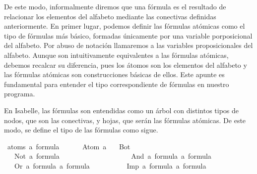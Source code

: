 \begin{isabellebody}
\begin{isamarkuptext}
De este modo, informalmente diremos que una fórmula es el resultado de relacionar los elementos del 
alfabeto mediante las conectivas definidas anteriormente. En primer lugar, podemos definir las 
fórmulas atómicas como el tipo de fórmulas más básico, formadas únicamente por una variable 
porposicional del alfabeto. Por abuso de notación llamaremos  a las variables proposicionales
del alfabeto. Aunque son intuitivamente equivalentes a las fórmulas atómicas, debemos recalcar 
su diferencia, pues los átomos son los elementos del alfabeto y las fórmulas atómicas son
construcciones básicas de ellos. Este apunte es fundamental para entender el tipo correspondiente
de fórmulas en nuestro programa.%
\end{isamarkuptext}\isamarkuptrue%
%
\begin{isamarkuptext}%
En Isabelle, las fórmulas son entendidas como un árbol con distintos tipos de nodos, que
son las conectivas, y hojas, que serán las fórmulas atómicas. De este modo, se define el tipo de 
las fórmulas como sigue.%
\end{isamarkuptext}\isamarkuptrue%
\isamarkupfalse%
\ {\isacharparenleft}atoms{\isacharcolon}\ {\isacharprime}a{\isacharparenright}\ formula\ {\isacharequal}\ \isanewline
\ \ \ \ Atom\ {\isacharprime}a\isanewline
\ \ {\isacharbar}\ Bot\ \ \ \ \ \ \ \ \ \ \ \ \ \ \ \ \ \ \ \ \ \ \ \ \ \ \ \ \ \ {\isacharparenleft}{\isachardoublequoteopen}{\isasymbottom}{\isachardoublequoteclose}{\isacharparenright}\ \ \isanewline
\ \ {\isacharbar}\ Not\ {\isachardoublequoteopen}{\isacharprime}a\ formula{\isachardoublequoteclose}\ \ \ \ \ \ \ \ \ \ \ \ \ \ \ \ \ {\isacharparenleft}{\isachardoublequoteopen}\isactrlbold {\isasymnot}{\isachardoublequoteclose}{\isacharparenright}\isanewline
\ \ {\isacharbar}\ And\ {\isachardoublequoteopen}{\isacharprime}a\ formula{\isachardoublequoteclose}\ {\isachardoublequoteopen}{\isacharprime}a\ formula{\isachardoublequoteclose}\ \ \ \ {\isacharparenleft}\ {\isachardoublequoteopen}\isactrlbold {\isasymand}{\isachardoublequoteclose}\ {}{}{\isacharparenright}\isanewline
\ \ {\isacharbar}\ Or\ {\isachardoublequoteopen}{\isacharprime}a\ formula{\isachardoublequoteclose}\ {\isachardoublequoteopen}{\isacharprime}a\ formula{\isachardoublequoteclose}\ \ \ \ \ {\isacharparenleft}\ {\isachardoublequoteopen}\isactrlbold {\isasymor}{\isachardoublequoteclose}\ {}{}{\isacharparenright}\isanewline
\ \ {\isacharbar}\ Imp\ {\isachardoublequoteopen}{\isacharprime}a\ formula{\isachardoublequoteclose}\ {\isachardoublequoteopen}{\isacharprime}a\ formula{\isachardoublequoteclose}\ \ \ \ {\isacharparenleft}\ {\isachardoublequoteopen}\isactrlbold {\isasymrightarrow}{\isachardoublequoteclose}\ {}{}{\isacharparenright}%

\end{isabellebody}
